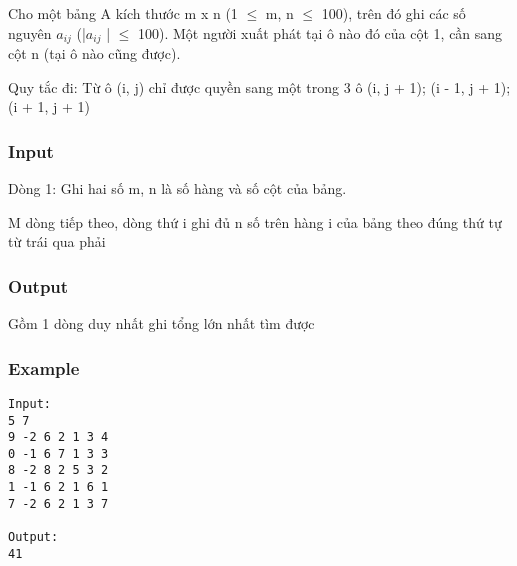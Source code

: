 



   Cho một bảng A kích thước m x n (1  $\le$  m, n  $\le$  100), trên đó ghi các số nguyên $a_{ij}$   (|$a_{ij}$   |  $\le$  100). Một người xuất phát tại ô nào đó của cột 1, cần sang cột n (tại ô nào cũng được).  

   Quy tắc đi: Từ ô (i, j) chỉ được quyền sang một trong 3 ô (i, j + 1); (i - 1, j + 1); (i + 1, j + 1)  

\subsubsection{   Input  }

   Dòng 1: Ghi hai số m, n là số hàng và số cột của bảng.  

   M dòng tiếp theo, dòng thứ i ghi đủ n số trên hàng i của bảng theo đúng thứ tự từ trái qua phải  

\subsubsection{   Output  }

   Gồm 1 dòng duy nhất ghi tổng lớn nhất tìm được  

\subsubsection{   Example  }
\begin{verbatim}
Input:
5 7
9 -2 6 2 1 3 4
0 -1 6 7 1 3 3
8 -2 8 2 5 3 2
1 -1 6 2 1 6 1
7 -2 6 2 1 3 7

Output:
41
\end{verbatim}
